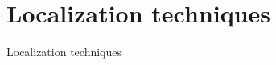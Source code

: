 \documentclass[11pt]{beamer}
\begin{document}








\section{Localization techniques}

\begin{frame}{}

  \begin{center}

    {\Huge Localization techniques}

  \end{center}

\end{frame}
\end{document}

